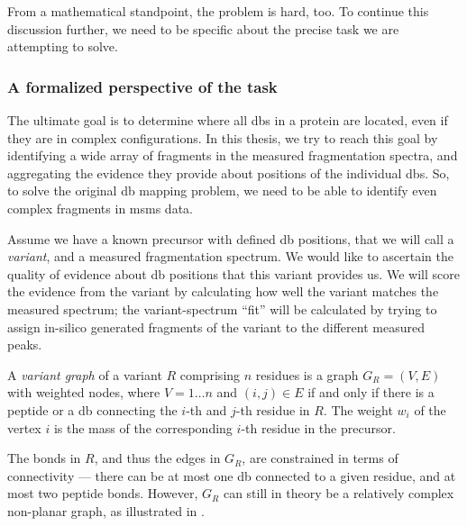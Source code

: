 From a mathematical standpoint, the problem is hard, too. To continue this discussion further, we need to be specific about the precise task we are attempting to solve.

\subsubsection{A formalized perspective of the task}

The ultimate goal is to determine where all \glspl*{db} in a protein are located, even if they are in complex configurations. In this thesis, we try to reach this goal by identifying a wide array of fragments in the measured fragmentation spectra, and aggregating the evidence they provide about positions of the individual \glspl*{db}. So, to solve the original \gls*{db} mapping problem, we need to be able to identify even complex fragments in \gls*{msms} data.

Assume we have a known precursor with defined \gls*{db} positions, that we will call a \emph{variant}, and a measured fragmentation spectrum. We would like to ascertain the quality of evidence about \gls*{db} positions that this variant provides us. We will score the evidence from the variant by calculating how well the variant matches the measured spectrum; the variant-spectrum ``fit'' will be calculated by trying to assign in-silico generated fragments of the variant to the different measured peaks.

\begin{defn}
  A \emph{variant graph} of a variant \(R\) comprising \(n\) residues is a graph \(G_R = (V, E)\) with weighted nodes, where \(V  = 1\ldots n\) and \((i, j) \in E\) if and only if there is a peptide or a \gls*{db} connecting  the \(i\)-th and \(j\)-th residue in \(R\). The weight \(w_i\) of the vertex \(i\) is the mass of the corresponding \(i\)-th residue in the precursor.
\end{defn}

The bonds in \(R\), and thus the edges in \(G_R\), are constrained in terms of connectivity --- there can be at most one \gls*{db} connected to a given residue, and at most two peptide bonds. However, \(G_R\) can still in theory be a relatively complex non-planar graph, as illustrated in .

